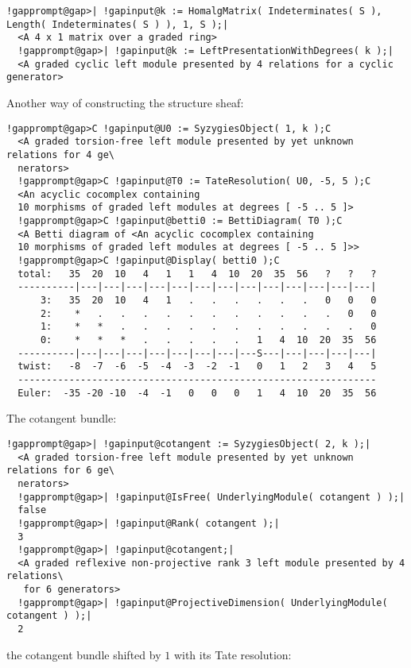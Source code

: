 \documentclass[a4paper,11pt]{report}
\begin{document}
{{{\begin{Verbatim}[commandchars=!@|,fontsize=\small,frame=single,label=Example]
  !gapprompt@gap>| !gapinput@k := HomalgMatrix( Indeterminates( S ), Length( Indeterminates( S ) ), 1, S );|
  <A 4 x 1 matrix over a graded ring>
  !gapprompt@gap>| !gapinput@k := LeftPresentationWithDegrees( k );|
  <A graded cyclic left module presented by 4 relations for a cyclic generator>
\end{Verbatim}
 Another way of constructing the structure sheaf: 
\begin{Verbatim}[commandchars=!@C,fontsize=\small,frame=single,label=Example]
  !gapprompt@gap>C !gapinput@U0 := SyzygiesObject( 1, k );C
  <A graded torsion-free left module presented by yet unknown relations for 4 ge\
  nerators>
  !gapprompt@gap>C !gapinput@T0 := TateResolution( U0, -5, 5 );C
  <An acyclic cocomplex containing
  10 morphisms of graded left modules at degrees [ -5 .. 5 ]>
  !gapprompt@gap>C !gapinput@betti0 := BettiDiagram( T0 );C
  <A Betti diagram of <An acyclic cocomplex containing 
  10 morphisms of graded left modules at degrees [ -5 .. 5 ]>>
  !gapprompt@gap>C !gapinput@Display( betti0 );C
  total:   35  20  10   4   1   1   4  10  20  35  56   ?   ?   ?
  ----------|---|---|---|---|---|---|---|---|---|---|---|---|---|
      3:   35  20  10   4   1   .   .   .   .   .   .   0   0   0
      2:    *   .   .   .   .   .   .   .   .   .   .   .   0   0
      1:    *   *   .   .   .   .   .   .   .   .   .   .   .   0
      0:    *   *   *   .   .   .   .   .   1   4  10  20  35  56
  ----------|---|---|---|---|---|---|---|---S---|---|---|---|---|
  twist:   -8  -7  -6  -5  -4  -3  -2  -1   0   1   2   3   4   5
  ---------------------------------------------------------------
  Euler:  -35 -20 -10  -4  -1   0   0   0   1   4  10  20  35  56
\end{Verbatim}
 The cotangent bundle: 
\begin{Verbatim}[commandchars=!@|,fontsize=\small,frame=single,label=Example]
  !gapprompt@gap>| !gapinput@cotangent := SyzygiesObject( 2, k );|
  <A graded torsion-free left module presented by yet unknown relations for 6 ge\
  nerators>
  !gapprompt@gap>| !gapinput@IsFree( UnderlyingModule( cotangent ) );|
  false
  !gapprompt@gap>| !gapinput@Rank( cotangent );|
  3
  !gapprompt@gap>| !gapinput@cotangent;|
  <A graded reflexive non-projective rank 3 left module presented by 4 relations\
   for 6 generators>
  !gapprompt@gap>| !gapinput@ProjectiveDimension( UnderlyingModule( cotangent ) );|
  2
\end{Verbatim}
 the cotangent bundle shifted by $1$ with its Tate resolution: 
\begin{Verbatim}[commandchars=!@C,fontsize=\small,frame=single,label=Example]

\end{Verbatim}}}}
\end{document}
